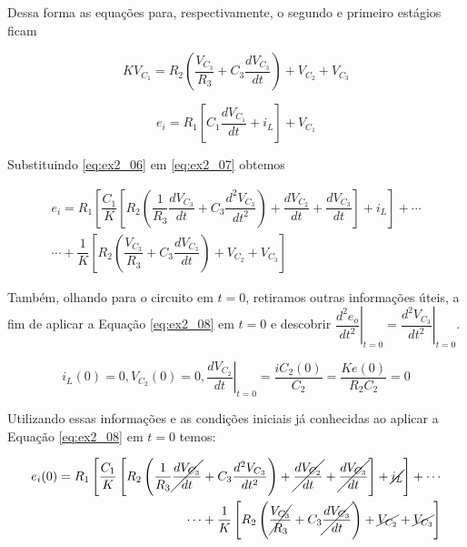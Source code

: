 \documentclass{article}
\numberwithin{equation}{section}
\newcommand{\deo}[1]{\dfrac{d^{#1}e_o}{dt^{#1}}}
\let\dfr\dfrac
\begin{document}
\noindent Dessa forma as equações para, respectivamente, o segundo e primeiro estágios ficam

\begin{equation}
    \label{eq:ex2_06}
    KV_{C_1} = R_2\left(\dfr{V_{C_3}}{R_3}+C_3\dfr{dV_{C_3}}{dt}\right)+V_{C_2}+V_{C_3}
\end{equation}

\begin{equation}
    \label{eq:ex2_07}
    e_i = R_1\left[C_1\dfr{dV_{C_1}}{dt}+i_L\right] + V_{C_1}
\end{equation}

\noindent Substituindo \eqref{eq:ex2_06} em \eqref{eq:ex2_07} obtemos

\begin{equation}
    \label{eq:ex2_08}
    \begin{split}
        e_i =  R_1\left[\dfr{C_1}{K}\left[R_2\left(\dfr{1}{R_3}\dfr{dV_{C_3}}{dt}+C_3\dfr{d^2V_{C_3}}{dt^2}\right)+\dfr{dV_{C_2}}{dt}+\dfr{dV_{C_3}}{dt}\right]+i_L\right] +\cdots\\
        \cdots+\dfr{1}{K}\left[R_2\left(\dfr{V_{C_3}}{R_3}+C_3\dfr{dV_{C_3}}{dt}\right)+V_{C_2}+V_{C_3}\right]
    \end{split}
\end{equation}

\noindent Também, olhando para o circuito em $t=0$, retiramos outras informações úteis, a fim de aplicar a Equação \eqref{eq:ex2_08} em $t=0$ e descobrir $\left.\deo{2}\right|_{t=0} = \left.\dfr{d^2V_{C_3}}{dt^2}\right|_{t=0}$.

\vspace{1.5mm}

\begin{equation*}
    i_L(0) = 0, V_{C_2}(0) = 0,  \left.\dfr{dV_{C_2}}{dt}\right|_{t=0} = \dfr{i{C_2}(0)}{C_2} = \dfr{Ke(0)}{R_2C_2} = 0
\end{equation*}

\noindent Utilizando essas informações e as condições iniciais já conhecidas ao aplicar a Equação \eqref{eq:ex2_08} em $t=0$ temos:

\begin{equation}
    \begin{split}
        e_i(0) =  R_1\left[\dfr{C_1}{K}\left[R_2\left(\dfr{1}{R_3}\cancel{\dfr{dV_{C_3}}{dt}}+C_3\dfr{d^2V_{C_3}}{dt^2}\right)+\cancel{\dfr{dV_{C_2}}{dt}}+\cancel{\dfr{dV_{C_3}}{dt}}\right]+\cancel{i_L}\right] +\cdots\\
        \cdots+\dfr{1}{K}\left[R_2\left(\cancel{\dfr{V_{C_3}}{R_3}}+C_3\cancel{\dfr{dV_{C_3}}{dt}}\right)+\cancel{V_{C_2}}+\cancel{V_{C_3}}\right]
    \end{split}
\end{equation}
\end{document}
